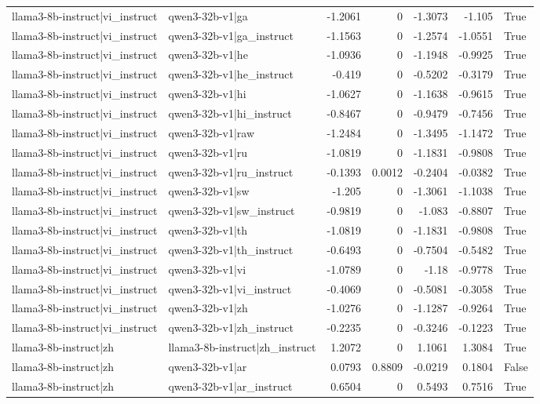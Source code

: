 \begin{table}
\begin{tabular}{l l r r r r l}
llama3-8b-instruct|vi_instruct & qwen3-32b-v1|ga & -1.2061 & 0 & -1.3073 & -1.105 & True \\
llama3-8b-instruct|vi_instruct & qwen3-32b-v1|ga_instruct & -1.1563 & 0 & -1.2574 & -1.0551 & True \\
llama3-8b-instruct|vi_instruct & qwen3-32b-v1|he & -1.0936 & 0 & -1.1948 & -0.9925 & True \\
llama3-8b-instruct|vi_instruct & qwen3-32b-v1|he_instruct & -0.419 & 0 & -0.5202 & -0.3179 & True \\
llama3-8b-instruct|vi_instruct & qwen3-32b-v1|hi & -1.0627 & 0 & -1.1638 & -0.9615 & True \\
llama3-8b-instruct|vi_instruct & qwen3-32b-v1|hi_instruct & -0.8467 & 0 & -0.9479 & -0.7456 & True \\
llama3-8b-instruct|vi_instruct & qwen3-32b-v1|raw & -1.2484 & 0 & -1.3495 & -1.1472 & True \\
llama3-8b-instruct|vi_instruct & qwen3-32b-v1|ru & -1.0819 & 0 & -1.1831 & -0.9808 & True \\
llama3-8b-instruct|vi_instruct & qwen3-32b-v1|ru_instruct & -0.1393 & 0.0012 & -0.2404 & -0.0382 & True \\
llama3-8b-instruct|vi_instruct & qwen3-32b-v1|sw & -1.205 & 0 & -1.3061 & -1.1038 & True \\
llama3-8b-instruct|vi_instruct & qwen3-32b-v1|sw_instruct & -0.9819 & 0 & -1.083 & -0.8807 & True \\
llama3-8b-instruct|vi_instruct & qwen3-32b-v1|th & -1.0819 & 0 & -1.1831 & -0.9808 & True \\
llama3-8b-instruct|vi_instruct & qwen3-32b-v1|th_instruct & -0.6493 & 0 & -0.7504 & -0.5482 & True \\
llama3-8b-instruct|vi_instruct & qwen3-32b-v1|vi & -1.0789 & 0 & -1.18 & -0.9778 & True \\
llama3-8b-instruct|vi_instruct & qwen3-32b-v1|vi_instruct & -0.4069 & 0 & -0.5081 & -0.3058 & True \\
llama3-8b-instruct|vi_instruct & qwen3-32b-v1|zh & -1.0276 & 0 & -1.1287 & -0.9264 & True \\
llama3-8b-instruct|vi_instruct & qwen3-32b-v1|zh_instruct & -0.2235 & 0 & -0.3246 & -0.1223 & True \\
llama3-8b-instruct|zh & llama3-8b-instruct|zh_instruct & 1.2072 & 0 & 1.1061 & 1.3084 & True \\
llama3-8b-instruct|zh & qwen3-32b-v1|ar & 0.0793 & 0.8809 & -0.0219 & 0.1804 & False \\
llama3-8b-instruct|zh & qwen3-32b-v1|ar_instruct & 0.6504 & 0 & 0.5493 & 0.7516 & True \\

\end{tabular}
\end{table}
